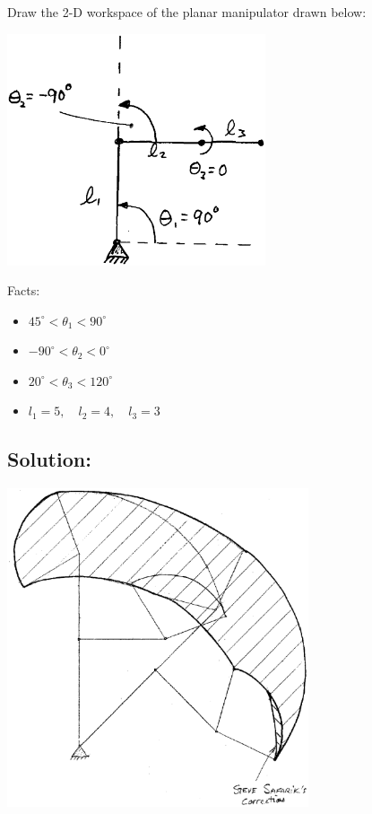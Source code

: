 \begin{Example}
Draw the 2-D workspace of the planar manipulator drawn below:

\includegraphics[width=3.0in]{figs04/00250.eps}

Facts:
\begin{itemize}
        \item $45^{\circ} < \theta_1   < 90^{\circ}$
        \item $-90^{\circ} < \theta_2  < 0^{\circ}$
        \item $20^{\circ} < \theta_3   < 120^{\circ}$
        \item $l_1 = 5, \quad l_2 = 4, \quad l_3 = 3$
\end{itemize}

\subsection*{Solution:}

\includegraphics[width=3.5in]{figs04/00442.eps}

\end{Example}












